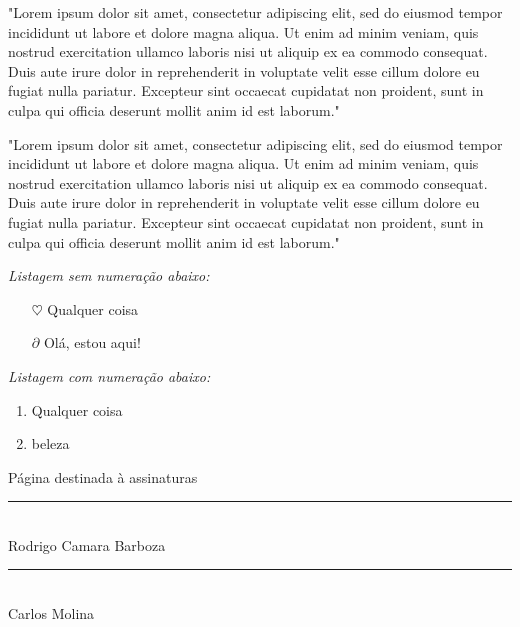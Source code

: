 \documentclass[12pt, a4paper, oneside]{book}
\begin{document}
"Lorem ipsum dolor sit amet, consectetur adipiscing elit, sed do eiusmod tempor incididunt ut labore et dolore magna aliqua. Ut enim ad minim veniam, quis nostrud exercitation ullamco laboris nisi ut aliquip ex ea commodo consequat. Duis aute irure dolor in reprehenderit in voluptate velit esse cillum dolore eu fugiat nulla pariatur. Excepteur sint occaecat cupidatat non proident, sunt in culpa qui officia deserunt mollit anim id est laborum."

"Lorem ipsum dolor sit amet, consectetur adipiscing elit, sed do eiusmod tempor incididunt ut labore et dolore magna aliqua. Ut enim ad minim veniam, quis nostrud exercitation ullamco laboris nisi ut aliquip ex ea commodo consequat. Duis aute irure dolor in reprehenderit in voluptate velit esse cillum dolore eu fugiat nulla pariatur. Excepteur sint occaecat cupidatat non proident, sunt in culpa qui officia deserunt mollit anim id est laborum."

\textit{Listagem sem numeração abaixo:}

\begin{itemize}
	\item[$\heartsuit$] Qualquer coisa
	\item[$\partial$] Olá, estou aqui!
\end{itemize}

\textit{Listagem com numeração abaixo:}

\begin{enumerate}
	\item Qualquer coisa
	\item beleza
\end{enumerate}



\hrulefill
\begin{center}
\Large{Página destinada à assinaturas}
\end{center}

\hrulefill

\vspace{2cm}

\begin{center}
\rule{10cm}{0.02cm}\\
Rodrigo Camara Barboza
\end{center}

\vspace{1cm}

\begin{center}
\rule{10cm}{0.02cm}\\
Carlos Molina
\end{center}
\newpage
\end{document}
